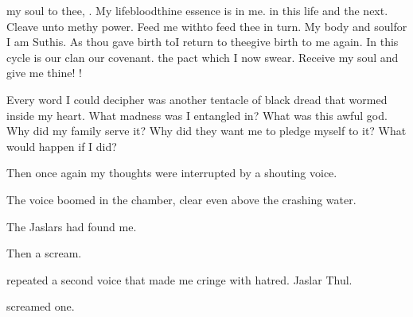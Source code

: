 \documentclass
  [a4paper,
   12pt,
   oneside
  ]%
  {article}
\begin{document}
\begin{diary}%
  \prikker my soul to thee, \Ubloth.
  My lifeblood\prikker thine essence is in me. 
  \prikker in this life and the next. 
  Cleave unto me\prikker thy power. 
  Feed me with\prikker to feed thee in turn. 
  My body and soul\prikker for I am Suthis. 
  As thou gave birth to\prikker I return to thee\prikker give birth to me again. 
  In this cycle is our clan\prikker 
  \prikker our covenant.
  \prikker the pact which I now swear. 
  Receive my soul and give me thine!
  \Ubloth!%
\end{diary}

Every word I could decipher was another tentacle of black dread that wormed inside my heart. 
What madness was I entangled in?
What was this awful god.
Why did my family serve it? 
Why did they want me to pledge myself to it? 
What would happen if I did?

Then once again my thoughts were interrupted by a shouting voice. 

The voice boomed in the chamber, clear even above the crashing water. 

The Jaslars had found me. 

Then a scream. 


 repeated a second voice that made me cringe with hatred. 
Jaslar Thul.
%
\index{\Isxae}
\index{\Nasshikerr}


 screamed one.
\end{document}
